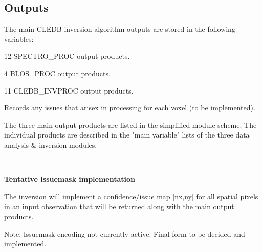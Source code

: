 \documentclass{article}
\begin{document}
\newpage
\subsection*{Outputs}

The main CLEDB inversion algorithm outputs are stored in the following variables:
\begin{description}
    [font=\normalfont,leftmargin=1.2in,style=multiline]
\item[$\qquad\bullet$ \textbf{specout}] 
 12 SPECTRO\_PROC output products.
\item[$\qquad\bullet$ \textbf{blosout}]  
4 BLOS\_PROC output products.
\item[$\qquad\bullet$ \textbf{invout}]  
11 CLEDB\_INVPROC output products.
\item[$\qquad\bullet$ \textbf{issuemask}]  
Records any issues that arisex in processing for each voxel (to be implemented).
\end{description}
The three main output products are listed in the simplified module scheme. The individual products are described in the "main variable" lists of the three data analysis \& inversion modules.

~

\textbf{Tentative issuemask implementation}

The inversion will implement a confidence/issue map [nx,ny] for all spatial pixels in an input observation that will be returned along with the main output products. 

Note: Issuemask encoding not currently active. Final form to be decided and implemented. 

~
\end{document}
